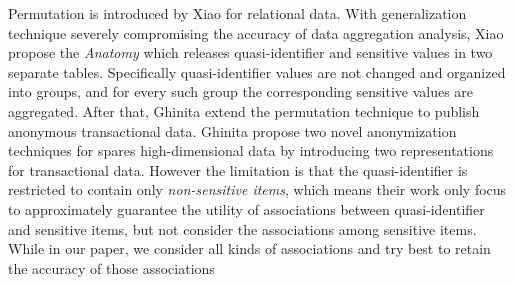 Permutation is introduced by Xiao \etal \cite{Xiao:2006:Anatomy} for
relational data. With generalization technique severely compromising the
accuracy of data aggregation analysis, Xiao \etal propose the
\textit{Anatomy} which releases quasi-identifier and sensitive values in two
separate tables. Specifically quasi-identifier values are not changed and
organized into groups, and for every such group the corresponding sensitive
values are aggregated. After that, Ghinita \etal \cite{2011:TKDE:Anonymous}
extend the permutation technique to publish anonymous transactional data.
Ghinita \etal propose two novel anonymization techniques for spares
high-dimensional data by introducing two representations for transactional
data. However the limitation is that the quasi-identifier is restricted to
contain only {\em non-sensitive items}, which means their work only focus to
approximately guarantee the utility of associations between quasi-identifier
and sensitive items, but not consider the associations among sensitive items.
While in our paper, we consider all kinds of associations and try best to
retain the accuracy of those associations 
%

